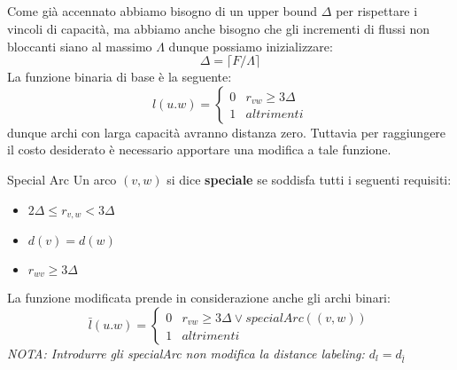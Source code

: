     \subparagraph*{} Come già accennato abbiamo bisogno di un upper bound $\Delta$ per rispettare i vincoli di capacità, ma abbiamo anche bisogno che gli incrementi di flussi non bloccanti siano al massimo $\Lambda$ dunque possiamo inizializzare:
    \[\Delta= \lceil F/\Lambda \rceil \]
    La funzione binaria di base è la seguente:
    \[l(u.w) = \left \{ \begin{array}{ll}
        0 & r_{vw} \ge 3\Delta\\
        1 & altrimenti
    \end{array} \right .\]
    dunque archi con larga capacità avranno distanza zero. Tuttavia per raggiungere il costo desiderato è necessario apportare una modifica a tale funzione.
    \begin{definition}{Special Arc}{}
        Un arco $(v,w)$ si dice \textbf{speciale} se soddisfa tutti i seguenti requisiti:
        \begin{itemize}
            \item $2\Delta \le r_{v,w} < 3\Delta$
            \item $d(v) = d(w)$
            \item $r_{wv} \ge 3\Delta$
        \end{itemize}
    \end{definition}    
    La funzione modificata prende in considerazione anche gli archi binari:
    \[\bar{l}(u.w) = \left \{ \begin{array}{ll}
        0 & r_{vw} \ge 3\Delta \lor specialArc((v,w))\\
        1 & altrimenti
    \end{array} \right .\]
\textit{NOTA: Introdurre gli specialArc non modifica la distance labeling: $d_l = d_{\bar{l}}$}

